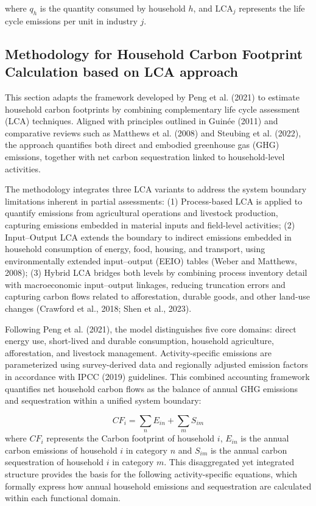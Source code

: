 \documentclass[12pt,a4paper]{article}%
\begin{document}
where \(q_h\) is the quantity consumed by household \(h\), and \(\text{LCA}_j\) represents the life cycle emissions per unit in industry \(j\).


\subsection{Methodology for Household Carbon Footprint Calculation based on LCA approach}
This section adapts the framework developed by Peng et al. (2021) to estimate household carbon footprints by combining complementary life cycle assessment (LCA) techniques. Aligned with principles outlined in Guinée (2011) and comparative reviews such as Matthews et al. (2008) and Steubing et al. (2022), the approach quantifies both direct and embodied greenhouse gas (GHG) emissions, together with net carbon sequestration linked to household-level activities.

The methodology integrates three LCA variants to address the system boundary limitations inherent in partial assessments: (1) Process-based LCA is applied to quantify emissions from agricultural operations and livestock production, capturing emissions embedded in material inputs and field-level activities; (2) Input–Output LCA extends the boundary to indirect emissions embedded in household consumption of energy, food, housing, and transport, using environmentally extended input–output (EEIO) tables (Weber and Matthews, 2008); (3) Hybrid LCA bridges both levels by combining process inventory detail with macroeconomic input–output linkages, reducing truncation errors and capturing carbon flows related to afforestation, durable goods, and other land-use changes (Crawford et al., 2018; Shen et al., 2023).

Following Peng et al. (2021), the model distinguishes five core domains: direct energy use, short-lived and durable consumption, household agriculture, afforestation, and livestock management. Activity-specific emissions are parameterized using survey-derived data and regionally adjusted emission factors in accordance with IPCC (2019) guidelines. This combined accounting framework quantifies net household carbon flows as the balance of annual GHG emissions and sequestration within a unified system boundary:

\begin{equation}
CF_i = \sum_{n} E_{in} + \sum_{m} S_{im}
\end{equation}
where $CF_i$ represents the Carbon footprint of household $i$, $E_{in}$ is the annual carbon emissions of household $i$ in category $n$ and $S_{im}$ is the annual carbon sequestration of household $i$ in category $m$. This disaggregated yet integrated structure provides the basis for the following activity-specific equations, which formally express how annual household emissions and sequestration are calculated within each functional domain.
\end{document}
